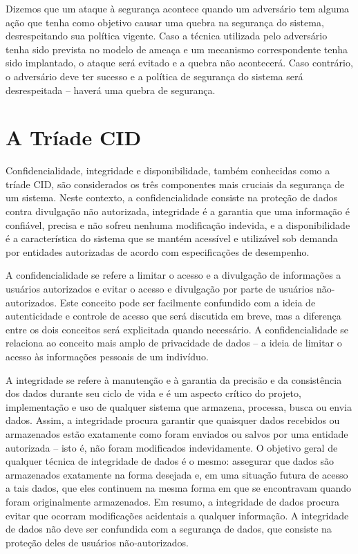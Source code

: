 \documentclass[
	10pt,				%
	openright,			%
	twoside,			%
	a5paper,			%
	english,			%
	french,				%
	spanish,			%
	brazil,				%
	sumario=tradicional
]{abntex2}
\begin{document}
Dizemos que um ataque à segurança acontece quando um adversário tem alguma ação que tenha como objetivo causar uma quebra na segurança do sistema, desrespeitando sua política vigente. Caso a técnica utilizada pelo adversário tenha sido prevista no modelo de ameaça e um mecanismo correspondente tenha sido implantado, o ataque será evitado e a quebra não acontecerá. Caso contrário, o adversário deve ter sucesso e a política de segurança do sistema será desrespeitada – haverá uma quebra de segurança.

\section{A Tríade CID}

Confidencialidade, integridade e disponibilidade, também conhecidas como a tríade CID, são considerados os três componentes mais cruciais da segurança de um sistema. Neste contexto, a confidencialidade consiste na proteção de dados contra divulgação não autorizada, integridade é a garantia que uma informação é confiável, precisa e não sofreu nenhuma modificação indevida, e a disponibilidade é a característica do sistema     que se mantém acessível e utilizável sob demanda por entidades autorizadas de acordo com especificações de desempenho.

A confidencialidade se refere a limitar o acesso e a divulgação de informações a usuários autorizados e evitar o acesso e divulgação por parte de usuários não-autorizados. Este conceito pode ser facilmente confundido com a ideia de autenticidade e controle de acesso que será discutida em breve, mas a diferença entre os dois conceitos será explicitada quando necessário. A confidencialidade se relaciona ao conceito mais amplo de privacidade de dados -- a ideia de limitar o acesso às informações pessoais de um indivíduo.

A integridade se refere à manutenção e à garantia da precisão e da consistência dos dados durante seu ciclo de vida e é um aspecto crítico do projeto, implementação e uso de qualquer sistema que armazena, processa, busca ou envia dados. Assim, a integridade procura garantir que quaisquer dados recebidos ou armazenados estão exatamente como foram enviados ou salvos por uma entidade autorizada -- isto é, não foram modificados indevidamente. O objetivo geral de qualquer técnica de integridade de dados é o mesmo: assegurar que dados são armazenados exatamente na forma desejada e, em uma situação futura de acesso a tais dados, que eles continuem na mesma forma em que se encontravam quando foram originalmente armazenados. Em resumo, a integridade de dados procura evitar que ocorram modificações acidentais a qualquer informação. A integridade de dados não deve ser confundida com a segurança de dados, que consiste na proteção deles de usuários não-autorizados.
\end{document}
